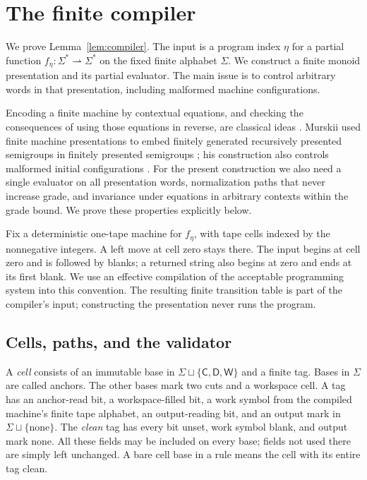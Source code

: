 \section{The finite compiler}\label{sec:compiler}

We prove Lemma~\ref{lem:compiler}. The input is a program index $\eta$
for a partial function $f_\eta:\Sigma^*\rightharpoonup\Sigma^*$ on the
fixed finite alphabet $\Sigma$. We construct a finite monoid presentation
and its partial evaluator. The main issue is to control arbitrary words
in that presentation, including malformed machine configurations.

Encoding a finite machine by contextual equations, and checking the
consequences of using those equations in reverse, are classical ideas
\cite[pp.~3--6]{Post1947}.
Murskii used finite machine presentations to embed finitely generated
recursively presented semigroups in finitely presented semigroups
\cite[Theorem~1.2 and Section~1.5]{Murskii1967}; his construction also
controls malformed initial configurations \cite[Section~2.4]{Murskii1967}.
For the present construction we also need a single evaluator on all
presentation words, normalization paths that never increase grade,
and invariance under equations in arbitrary contexts within the grade
bound. We prove these properties explicitly below.

Fix a deterministic one-tape machine for $f_\eta$, with tape cells indexed
by the nonnegative integers. A left move at cell zero stays there. The
input begins at cell zero and is followed by blanks; a returned string
also begins at zero and ends at its first blank. We use an effective
compilation of the acceptable programming system into this convention.
The resulting finite transition table is part of the compiler's input;
constructing the presentation never runs the program.

\subsection{Cells, paths, and the validator}

A \emph{cell} consists of an immutable base in
$\Sigma\sqcup\{\mathsf C,\mathsf D,\mathsf W\}$ and a finite tag.
Bases in $\Sigma$ are called anchors. The other bases mark two cuts and
a workspace cell. A tag has an anchor-read bit, a workspace-filled bit,
a work symbol from the compiled machine's finite tape alphabet, an
output-reading bit, and an output mark in $\Sigma\sqcup\{\mathrm{none}\}$.
The \emph{clean} tag has every bit unset, work symbol blank, and output
mark none. All these fields may be included on every base; fields not
used there are simply left unchanged. A bare cell base in a rule means
the cell with its entire tag clean.

